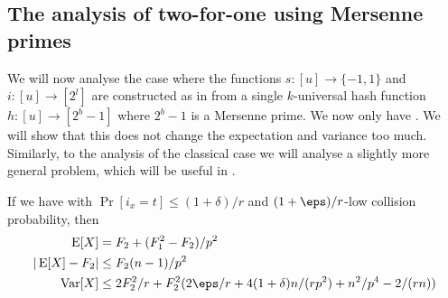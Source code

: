\subsection{The analysis of two-for-one using Mersenne primes}
We will now analyse the case where the functions $s : [u] \to \{-1, 1\}$
and $i : [u] \to [2^l]$ are constructed as in  from a
single $k$-universal hash function $h : [u] \to [2^b - 1]$ where $2^b - 1$
is a Mersenne prime.
We now only have .
We will show that this does
not change the expectation and variance too much. Similarly, to the
analysis of the classical case we will analyse a slightly more general
problem, which will be useful in .
\begin{lemma}\label{lem:count-mersenne}
   If we have  with $
    \Pr[i_x = t] \le (1 + \delta)/r$
   and $(1+\eps)/r$-low collision probability,
   then
    \begin{align}
        \E[X] &= F_2 + (F_1^2 - F_2)/p^2 \\
        | \E[X] - F_2 | &\le F_2 (n - 1)/p^2 \\
        \Var[X] &\le 2F_2^2/r + F_2^2 (2\eps/r + 4(1 + \delta)n / (rp^2) + n^2/p^4 - 2 /(rn))
    \end{align}
\end{lemma}
